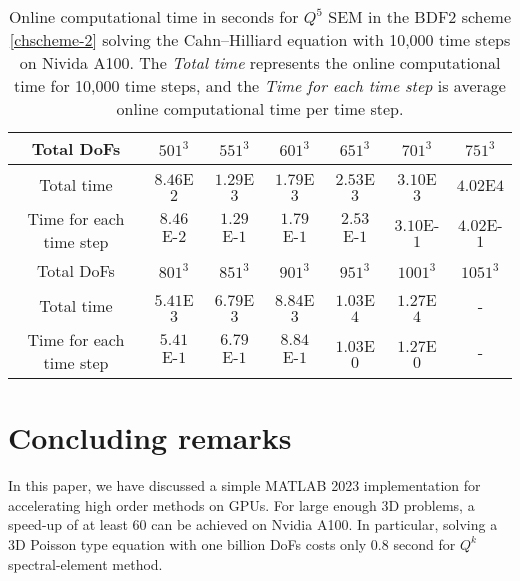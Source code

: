 \documentclass{article}
\begin{document}
\begin{table}[ht!]
    \centering
    \begin{tabular}{|c|c|c|c|c|c|c|}
    \hline
         Total DoFs & $501^3$ & $551^3$ & $601^3$ & $651^3$ & $701^3$ & $751^3$\\
    \hline
        Total time & $8.46$E$2$ & $1.29$E$3$ & $1.79$E$3$ & $2.53$E$3$ & $3.10$E$3$ & $4.02$E$4$\\
    \hline
         Time for each time step & $8.46$E-$2$ & $1.29$E-$1$ & $1.79$E-$1$ & $2.53$E-$1$ & $3.10$E-$1$ & $4.02$E-$1$\\
    \hline
    \hline
         Total DoFs & $801^3$ & $851^3$ & $901^3$ & $951^3$ & $1001^3$ & $1051^3$\\
    \hline
         Total time & $5.41$E$3$ & $6.79$E$3$ & $8.84$E$3$ & $1.03$E$4$ & $1.27$E$4$ & -\\
    \hline
         Time for each time step & $5.41$E-$1$ & $6.79$E-$1$ & $8.84$E-$1$ & $1.03$E$0$ & $1.27$E$0$ & -\\
    \hline
    \end{tabular}
    \caption{Online computational time in seconds for $Q^5$ SEM in the BDF2 scheme \eqref{chscheme-2} solving the Cahn--Hilliard equation with 10,000 time steps on Nivida A100. The {\it Total time} represents the online computational time for 10,000 time steps, and the {\it Time for each time step} is average online computational time per time step.}
    \label{tab5: Cahn-Hilliard_GPU}
\end{table}

\section{Concluding remarks}
\label{sec:remark}
In this paper, we have discussed a simple MATLAB 2023 implementation for accelerating high order methods on GPUs. For large enough 3D problems, a speed-up of at least 60 can be achieved on Nvidia A100. In particular, solving a 3D Poisson type equation with one billion DoFs costs only 0.8 second for $Q^k$ spectral-element method. 
 
\appendix 
\end{document}
